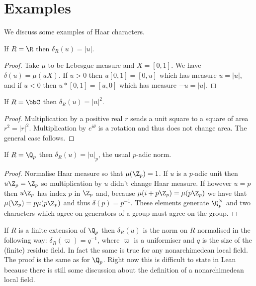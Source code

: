 \section{Examples}

We discuss some examples of Haar characters.

\begin{lemma}
  \label{MeasureTheory.ringHaarChar_real}
  If $R=\R$ then $\delta_R(u)=|u|$.
  \leanok
\end{lemma}
\begin{proof}
  \leanok
  Take $\mu$ to be Lebesgue measure and $X=[0,1]$.
We have $\delta(u)=\mu(uX)$. If $u>0$ then $u[0,1]=[0,u]$ which has measure $u=|u|$,
and if $u<0$ then $u*[0,1]=[u,0]$ which has measure $-u=|u|$.
\end{proof}

\begin{lemma}
  \label{MeasureTheory.ringHaarChar_complex}
  \leanok
  If $R=\bbC$ then $\delta_R(u)=|u|^2$.
\end{lemma}
\begin{proof}
  \leanok
  Multiplication by a positive real $r$ sends a unit square to a square of area $r^2=|r|^2$.
  Multiplication by $e^{i\theta}$ is a rotation and thus does not change area.
  The general case follows.
\end{proof}

\begin{lemma}
  \label{MeasureTheory.ringHaarChar_padic}
  \leanok
  If $R=\Q_p$ then $\delta_R(u)=|u|_p$, the usual $p$-adic norm.
\end{lemma}
\begin{proof}
  \leanok
  Normalise Haar measure so that $\mu(\Z_p)=1$.
  If $u$ is a $p$-adic unit then $u\Z_p=\Z_p$ so multiplication by $u$ didn't change
  Haar measure. If however $u=p$ then $u\Z_p$ has index $p$ in $\Z_p$ and, because
  $\mu(i+p\Z_p)=\mu(p\Z_p)$ we have that $\mu(\Z_p)=p\mu(p\Z_p)$ and thus $\delta(p)=p^{-1}$.
  These elements generate $\Q_p^\times$ and two characters which agree on generators
  of a group must agree on the group.
\end{proof}

\begin{remark}
If $R$ is a finite extension of $\Q_p$ then $\delta_R(u)$
is the norm on $R$ normalised in the following way:
$\delta_R(\varpi)=q^{-1}$, where $\varpi$ is a uniformiser
and $q$ is the size of the (finite) residue field. In fact the same is true
for any nonarchimedean local field. The proof is
the same as for $\Q_p$. Right now this is difficult to state in Lean because
there is still some discussion about the definition of a nonarchimedean local field.
\end{remark}

